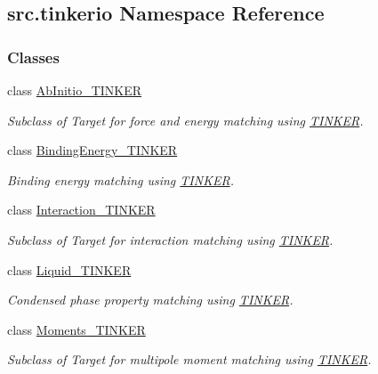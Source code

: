 \hypertarget{namespacesrc_1_1tinkerio}{}\subsection{src.\+tinkerio Namespace Reference}
\label{namespacesrc_1_1tinkerio}
\subsubsection*{Classes}
\begin{DoxyCompactItemize}
\item 
class \hyperlink{classsrc_1_1tinkerio_1_1AbInitio__TINKER}{Ab\+Initio\+\_\+\+T\+I\+N\+K\+ER}
\begin{DoxyCompactList}\small\item\em Subclass of Target for force and energy matching using \hyperlink{classsrc_1_1tinkerio_1_1TINKER}{T\+I\+N\+K\+ER}. \end{DoxyCompactList}\item 
class \hyperlink{classsrc_1_1tinkerio_1_1BindingEnergy__TINKER}{Binding\+Energy\+\_\+\+T\+I\+N\+K\+ER}
\begin{DoxyCompactList}\small\item\em Binding energy matching using \hyperlink{classsrc_1_1tinkerio_1_1TINKER}{T\+I\+N\+K\+ER}. \end{DoxyCompactList}\item 
class \hyperlink{classsrc_1_1tinkerio_1_1Interaction__TINKER}{Interaction\+\_\+\+T\+I\+N\+K\+ER}
\begin{DoxyCompactList}\small\item\em Subclass of Target for interaction matching using \hyperlink{classsrc_1_1tinkerio_1_1TINKER}{T\+I\+N\+K\+ER}. \end{DoxyCompactList}\item 
class \hyperlink{classsrc_1_1tinkerio_1_1Liquid__TINKER}{Liquid\+\_\+\+T\+I\+N\+K\+ER}
\begin{DoxyCompactList}\small\item\em Condensed phase property matching using \hyperlink{classsrc_1_1tinkerio_1_1TINKER}{T\+I\+N\+K\+ER}. \end{DoxyCompactList}\item 
class \hyperlink{classsrc_1_1tinkerio_1_1Moments__TINKER}{Moments\+\_\+\+T\+I\+N\+K\+ER}
\begin{DoxyCompactList}\small\item\em Subclass of Target for multipole moment matching using \hyperlink{classsrc_1_1tinkerio_1_1TINKER}{T\+I\+N\+K\+ER}. \end{DoxyCompactList}\item 

\end{DoxyCompactItemize}
